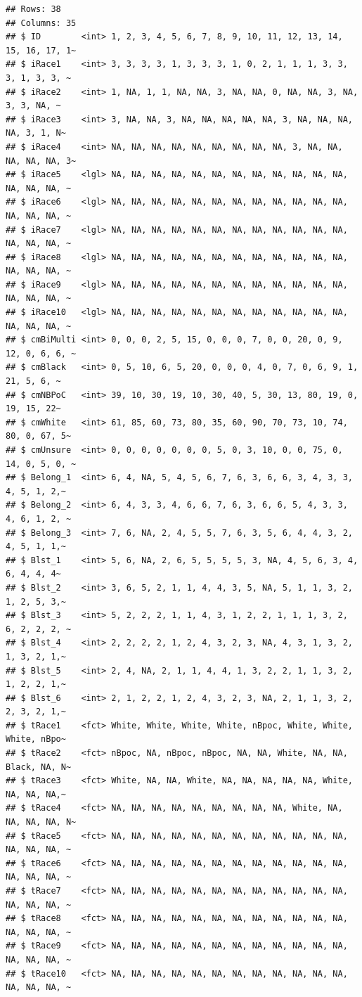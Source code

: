 \documentclass[
  english,
]{book}
\begin{document}
\begin{verbatim}
## Rows: 38
## Columns: 35
## $ ID        <int> 1, 2, 3, 4, 5, 6, 7, 8, 9, 10, 11, 12, 13, 14, 15, 16, 17, 1~
## $ iRace1    <int> 3, 3, 3, 3, 1, 3, 3, 3, 1, 0, 2, 1, 1, 1, 3, 3, 3, 1, 3, 3, ~
## $ iRace2    <int> 1, NA, 1, 1, NA, NA, 3, NA, NA, 0, NA, NA, 3, NA, 3, 3, NA, ~
## $ iRace3    <int> 3, NA, NA, 3, NA, NA, NA, NA, NA, 3, NA, NA, NA, NA, 3, 1, N~
## $ iRace4    <int> NA, NA, NA, NA, NA, NA, NA, NA, NA, 3, NA, NA, NA, NA, NA, 3~
## $ iRace5    <lgl> NA, NA, NA, NA, NA, NA, NA, NA, NA, NA, NA, NA, NA, NA, NA, ~
## $ iRace6    <lgl> NA, NA, NA, NA, NA, NA, NA, NA, NA, NA, NA, NA, NA, NA, NA, ~
## $ iRace7    <lgl> NA, NA, NA, NA, NA, NA, NA, NA, NA, NA, NA, NA, NA, NA, NA, ~
## $ iRace8    <lgl> NA, NA, NA, NA, NA, NA, NA, NA, NA, NA, NA, NA, NA, NA, NA, ~
## $ iRace9    <lgl> NA, NA, NA, NA, NA, NA, NA, NA, NA, NA, NA, NA, NA, NA, NA, ~
## $ iRace10   <lgl> NA, NA, NA, NA, NA, NA, NA, NA, NA, NA, NA, NA, NA, NA, NA, ~
## $ cmBiMulti <int> 0, 0, 0, 2, 5, 15, 0, 0, 0, 7, 0, 0, 20, 0, 9, 12, 0, 6, 6, ~
## $ cmBlack   <int> 0, 5, 10, 6, 5, 20, 0, 0, 0, 4, 0, 7, 0, 6, 9, 1, 21, 5, 6, ~
## $ cmNBPoC   <int> 39, 10, 30, 19, 10, 30, 40, 5, 30, 13, 80, 19, 0, 19, 15, 22~
## $ cmWhite   <int> 61, 85, 60, 73, 80, 35, 60, 90, 70, 73, 10, 74, 80, 0, 67, 5~
## $ cmUnsure  <int> 0, 0, 0, 0, 0, 0, 0, 5, 0, 3, 10, 0, 0, 75, 0, 14, 0, 5, 0, ~
## $ Belong_1  <int> 6, 4, NA, 5, 4, 5, 6, 7, 6, 3, 6, 6, 3, 4, 3, 3, 4, 5, 1, 2,~
## $ Belong_2  <int> 6, 4, 3, 3, 4, 6, 6, 7, 6, 3, 6, 6, 5, 4, 3, 3, 4, 6, 1, 2, ~
## $ Belong_3  <int> 7, 6, NA, 2, 4, 5, 5, 7, 6, 3, 5, 6, 4, 4, 3, 2, 4, 5, 1, 1,~
## $ Blst_1    <int> 5, 6, NA, 2, 6, 5, 5, 5, 5, 3, NA, 4, 5, 6, 3, 4, 6, 4, 4, 4~
## $ Blst_2    <int> 3, 6, 5, 2, 1, 1, 4, 4, 3, 5, NA, 5, 1, 1, 3, 2, 1, 2, 5, 3,~
## $ Blst_3    <int> 5, 2, 2, 2, 1, 1, 4, 3, 1, 2, 2, 1, 1, 1, 3, 2, 6, 2, 2, 2, ~
## $ Blst_4    <int> 2, 2, 2, 2, 1, 2, 4, 3, 2, 3, NA, 4, 3, 1, 3, 2, 1, 3, 2, 1,~
## $ Blst_5    <int> 2, 4, NA, 2, 1, 1, 4, 4, 1, 3, 2, 2, 1, 1, 3, 2, 1, 2, 2, 1,~
## $ Blst_6    <int> 2, 1, 2, 2, 1, 2, 4, 3, 2, 3, NA, 2, 1, 1, 3, 2, 2, 3, 2, 1,~
## $ tRace1    <fct> White, White, White, White, nBpoc, White, White, White, nBpo~
## $ tRace2    <fct> nBpoc, NA, nBpoc, nBpoc, NA, NA, White, NA, NA, Black, NA, N~
## $ tRace3    <fct> White, NA, NA, White, NA, NA, NA, NA, NA, White, NA, NA, NA,~
## $ tRace4    <fct> NA, NA, NA, NA, NA, NA, NA, NA, NA, White, NA, NA, NA, NA, N~
## $ tRace5    <fct> NA, NA, NA, NA, NA, NA, NA, NA, NA, NA, NA, NA, NA, NA, NA, ~
## $ tRace6    <fct> NA, NA, NA, NA, NA, NA, NA, NA, NA, NA, NA, NA, NA, NA, NA, ~
## $ tRace7    <fct> NA, NA, NA, NA, NA, NA, NA, NA, NA, NA, NA, NA, NA, NA, NA, ~
## $ tRace8    <fct> NA, NA, NA, NA, NA, NA, NA, NA, NA, NA, NA, NA, NA, NA, NA, ~
## $ tRace9    <fct> NA, NA, NA, NA, NA, NA, NA, NA, NA, NA, NA, NA, NA, NA, NA, ~
## $ tRace10   <fct> NA, NA, NA, NA, NA, NA, NA, NA, NA, NA, NA, NA, NA, NA, NA, ~
\end{verbatim}
\end{document}
